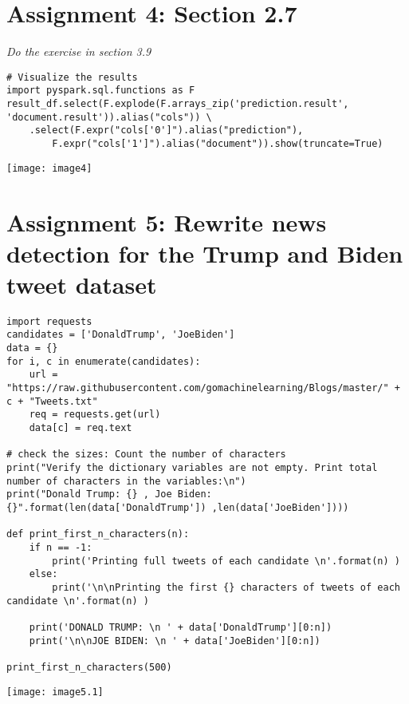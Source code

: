 \documentclass[]{article}
\begin{document}
\section*{Assignment 4: Section 2.7}
\emph{ Do the exercise in section 3.9 }

\begin{verbatim}
# Visualize the results
import pyspark.sql.functions as F
result_df.select(F.explode(F.arrays_zip('prediction.result', 
'document.result')).alias("cols")) \
	.select(F.expr("cols['0']").alias("prediction"),
		F.expr("cols['1']").alias("document")).show(truncate=True)
\end{verbatim}
\texttt{[image: image4]}

\clearpage

\section*{Assignment 5: Rewrite news detection for the Trump and Biden tweet dataset}
\begin{verbatim}
import requests
candidates = ['DonaldTrump', 'JoeBiden']
data = {}
for i, c in enumerate(candidates):
	url = "https://raw.githubusercontent.com/gomachinelearning/Blogs/master/" + c + "Tweets.txt"
	req = requests.get(url)
	data[c] = req.text

# check the sizes: Count the number of characters
print("Verify the dictionary variables are not empty. Print total number of characters in the variables:\n")
print("Donald Trump: {} , Joe Biden: {}".format(len(data['DonaldTrump']) ,len(data['JoeBiden'])))

def print_first_n_characters(n):
	if n == -1:
		print('Printing full tweets of each candidate \n'.format(n) )
	else:
		print('\n\nPrinting the first {} characters of tweets of each candidate \n'.format(n) )
	
	print('DONALD TRUMP: \n ' + data['DonaldTrump'][0:n])  
	print('\n\nJOE BIDEN: \n ' + data['JoeBiden'][0:n])

print_first_n_characters(500)
\end{verbatim}
\texttt{[image: image5.1]} %
\end{document}
